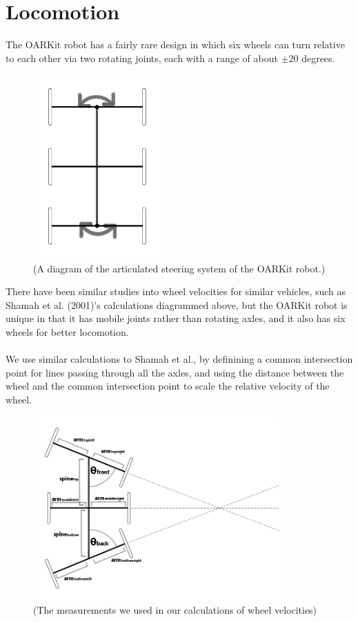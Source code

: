 \documentclass[]{article}
\begin{document}
\section{Locomotion}
The OARKit robot has a fairly rare design in which six wheels can turn relative to each other via two rotating joints, each with a range of about $\pm20$ degrees.
\begin{figure}[ht]
    \includegraphics[height = 200pt]{report_images/diagram1.png}
    \caption{(A diagram of the articulated steering system of the OARKit robot.)}
    \label{fig:diagram1}
\end{figure}
There have been similar studies into wheel velocities for similar vehicles, such as Shamah et al. (2001)'s calculations diagrammed above, but the OARKit robot is unique in that it has mobile joints rather than rotating axles, and it also has six wheels for better locomotion.
\\
\\
We use similar calculations to Shamah et al., by definining a common intersection point for lines passing through all the axles, and using the distance between the wheel and the common intersection point to scale the relative velocity of the wheel.
\\
\begin{figure}[ht]
    \includegraphics[height = 200pt]{report_images/diagram2.png}
    \caption{(The measurements we used in our calculations of wheel velocities)}
    \label{fig:diagram2}
\end{figure}
\end{document}
